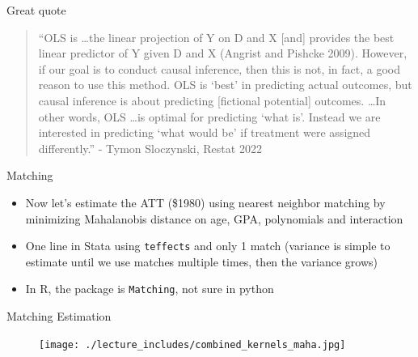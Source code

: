 \documentclass{beamer}
\begin{document}
\begin{frame}{Great quote}

\begin{quote}
``OLS is \dots the linear projection of Y on D and X [and] provides the best linear predictor of Y given D and X (Angrist and Pishcke 2009).  However, if our goal is to conduct causal inference, then this is not, in fact, a good reason to use this method.  OLS is `best' in predicting actual outcomes, but causal inference is about predicting [fictional potential] outcomes.  \dots In other words, OLS \dots is optimal for predicting `what is'.  Instead we are interested in predicting `what would be' if treatment were assigned differently.'' - Tymon Sloczynski, Restat 2022
\end{quote}

\end{frame}


\begin{frame}{Matching}

\begin{itemize}

\item Now let's estimate the ATT (\$1980) using nearest neighbor matching by minimizing Mahalanobis distance on age, GPA, polynomials and interaction
\item One line in Stata using \texttt{teffects} and only 1 match (variance is simple to estimate until we use matches multiple times, then the variance grows)
\item In R, the package is \texttt{Matching}, not sure in python
\end{itemize}

\end{frame}


\begin{frame}{Matching Estimation}

\begin{figure}[!t]\centering
\texttt{[image: ./lecture\_includes/combined\_kernels\_maha.jpg]}
\end{figure}

\end{frame}
\end{document}

